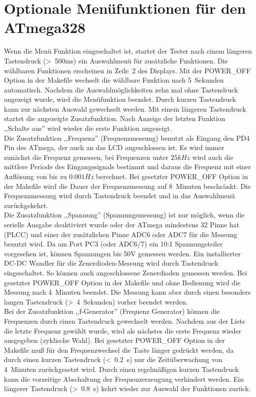 \section{Optionale Menüfunktionen für den ATmega328}
Wenn die Menü Funktion eingeschaltet ist, startet der Tester nach einem längeren Tastendruck (\textgreater~500ms) ein Auswahlmenü
für zusätzliche Funktionen.
Die wählbaren Funktionen erscheinen in Zeile~2 des Displays.
Mit der POWER\_OFF Option in der Makefile wechselt die wählbare Funktion nach 5~Sekunden automatisch.
Nachdem die Auswahlmöglichkeiten zehn mal ohne Tastendruck angezeigt wurde, wird die Menüfunktion beendet.
Durch kurzen Tastendruck kann zur nächsten Auswahl gewechselt werden.
Mit einem längeren Tastendruck startet die angezeigte Zusatzfunktion.
Nach Anzeige der letzten Funktion ,,Schalte aus'' wird wieder die erste Funktion angezeigt.\\

Die Zusatzfunktion ,,Frequenz'' (Frequenzmessung) benutzt als Eingang den PD4 Pin des ATmega, der auch an das LCD angeschlossen ist.
Es wird immer zunächst die Frequenz gemessen, bei Frequenzen unter \(25 kHz\) wird auch die mittlere Periode des Eingangssignals
bestimmt und daraus die Frequenz mit einer Auflösung von bis zu \(0.001 Hz\) berechnet.
Bei gesetzter POWER\_OFF Option in der Makefile wird die Dauer der Frequenzmessung auf 8~Minuten beschränkt.
Die Frequenzmessung wird durch Tastendruck beendet und in das Auswahlmenü zurückgekehrt.\\

Die Zusatzfunktion ,,Spannung'' (Spannungsmessung) ist nur möglich, wenn die serielle Ausgabe deaktiviert wurde
oder der ATmega mindestens 32 Pinne hat (PLCC) und einer der zusätzlichen Pinne ADC6 oder ADC7 für die Messung benutzt wird.
Da am Port PC3 (oder ADC6/7) ein 10:1 Spannungsteiler vorgesehen ist, können Spannungen bis 50V gemessen werden.
Ein installierter DC-DC Wandler für die Zenerdioden-Messung wird durch Tastendruck eingeschaltet.
So können auch angeschlossene Zenerdioden gemessen werden.
Bei gesetzter POWER\_OFF Option in der Makefile und ohne Bedienung wird die Messung nach 4~Minuten beendet.
Die Messung kann aber durch einen besonders langen Tastendruck (\textgreater~4~Sekunden) vorher beendet werden.\\

Bei der Zusatzfunktion ,,f-Generator'' (Frequenz Generator) können die Frequenzen durch einen Tastendruck 
 gewechselt werden.
Nachdem aus der Liste die letzte Frequenz gewählt wurde, wird als nächstes die erste Frequenz
 wieder ausgegeben (zyklische Wahl).
Bei gesetzter POWER\_OFF Option in der Makefile muß für den Frequenzwechsel die Taste länger gedrückt werden, da
durch einen kurzen Tastendruck (\textless~0.2~s) nur die Zeitüberwachung von 4~Minuten zurückgesetzt wird.
Durch einen regelmäßigen kurzen Tastendruck kann die vorzeitige Abschaltung der Frequenzerzeugung verhindert werden.
Ein längerer Tastendruck (\textgreater~0.8~s) kehrt wieder zur Auswahl der Funktionen zurück.\\

